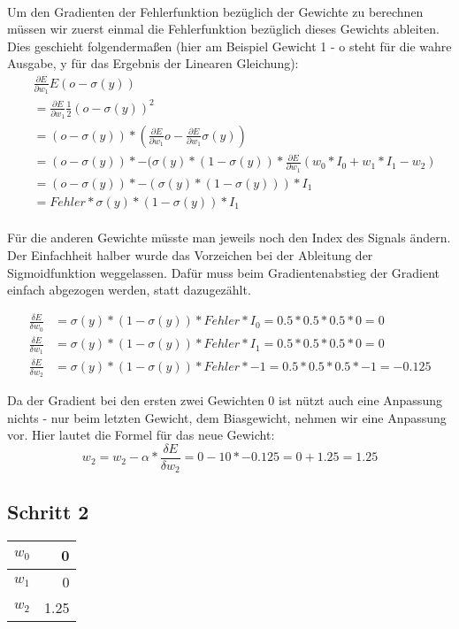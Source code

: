 \documentclass[a4paper]{article}
\begin{document}
\paragraph{}
Um den Gradienten der Fehlerfunktion bezüglich der Gewichte zu berechnen müssen wir zuerst einmal die Fehlerfunktion bezüglich dieses Gewichts ableiten. Dies geschieht folgendermaßen (hier am Beispiel Gewicht 1 - o steht für die wahre Ausgabe, y für das Ergebnis der Linearen Gleichung):
\begin{align*}
	&\frac{\partial E}{\partial w_1} E(o - \sigma(y)) \\ 
	&= \frac{\partial E}{\partial w_1} \frac{1}{2}(o - \sigma(y))^2 \\
	&= (o - \sigma(y)) * (\frac{\partial E}{\partial w_1}o - \frac{\partial E}{\partial w_1}\sigma(y)) \\
	&= (o - \sigma(y)) * -(\sigma(y) * (1 - \sigma(y)) * \frac{\partial E}{\partial w_1}(w_0*I_0 + w_1*I_1-w_2) \\
	&= (o - \sigma(y)) * -(\sigma(y) * (1 - \sigma(y))) * I_1 \\
	&= Fehler * \sigma(y) * (1 - \sigma(y)) * I_1 
\end{align*}
\paragraph{}
Für die anderen Gewichte müsste man jeweils noch den Index des Signals ändern.
Der Einfachheit halber wurde das Vorzeichen bei der Ableitung der Sigmoidfunktion weggelassen. Dafür muss beim Gradientenabstieg der Gradient einfach abgezogen werden, statt dazugezählt.

\begin{align*}
	\frac{\delta E}{\delta w_0} &= \sigma(y) * (1 - \sigma(y)) * Fehler * I_0 = 0.5 * 0.5 * 0.5 * 0 = 0 \\
	\frac{\delta E}{\delta w_1} &= \sigma(y) * (1 - \sigma(y)) * Fehler * I_1 = 0.5 * 0.5 * 0.5 * 0 = 0 \\
	\frac{\delta E}{\delta w_2} &= \sigma(y) * (1 - \sigma(y)) * Fehler * -1 = 0.5 * 0.5 * 0.5 * -1 = -0.125
\end{align*}

Da der Gradient bei den ersten zwei Gewichten 0 ist nützt auch eine Anpassung nichts - nur beim letzten Gewicht, dem Biasgewicht, nehmen wir eine Anpassung vor. Hier lautet die Formel für das neue Gewicht:
\[
	w_2 = w_2 - \alpha * \frac{\delta E}{\delta w_2} = 0 - 10 * -0.125 = 0 + 1.25 = 1.25
\]

\subsection{Schritt 2}
\begin{tabular}{|l|r|}
	\hline
	$w_0$ & 0 \\\hline
	$w_1$ & 0 \\\hline
	$w_2$ & 1.25 \\\hline
\end{tabular}
\end{document}
